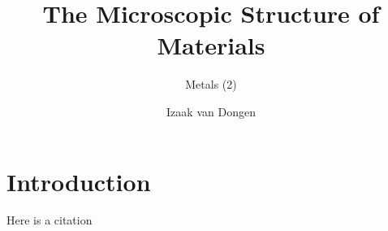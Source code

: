 \documentclass{scrartcl}
\title{The Microscopic Structure of Materials}
\subtitle{Metals (2)}
\author{Izaak van Dongen}
\begin{document}
    \maketitle
    \tableofcontents
    \section{Introduction}

    Here is a citation\cite{OCRPhysics}

{}

\end{document}
